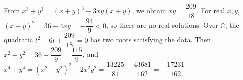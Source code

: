 From $x^3+y^3=(x+y)^3-3xy(x+y)$, we obtain $xy=\dfrac{209}{18}$. For real $x,y$, $(x-y)^2=36-4xy=-\dfrac{94}{9}<0$, so there are no real solutions. Over $\mathbb C$, the quadratic $t^2-6t+\dfrac{209}{18}=0$ has two roots satisfying the data. Then $x^2+y^2=36-\dfrac{209}{9}=\dfrac{115}{9}$, and $x^4+y^4=(x^2+y^2)^2-2x^2y^2=\dfrac{13225}{81}-\dfrac{43681}{162}=\boxed{-\dfrac{17231}{162}}$.
